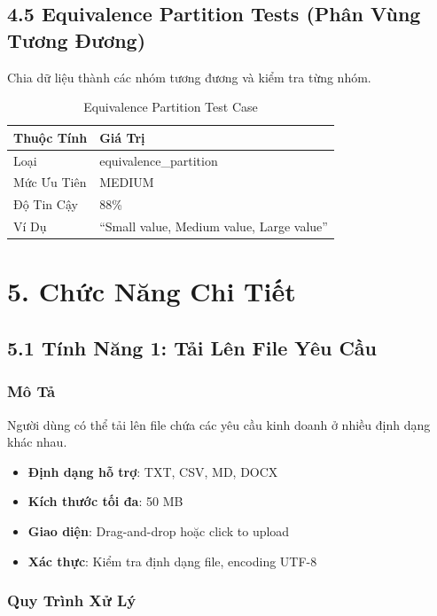 \documentclass[14pt,a4paper]{article}
\begin{document}
\subsection{4.5 Equivalence Partition Tests (Phân Vùng Tương Đương)}
Chia dữ liệu thành các nhóm tương đương và kiểm tra từng nhóm.

\begin{table}[h]
\centering
\begin{tabular}{|l|l|}
\hline
\textbf{Thuộc Tính} & \textbf{Giá Trị} \\
\hline
Loại & equivalence\_partition \\
\hline
Mức Ưu Tiên & MEDIUM \\
\hline
Độ Tin Cậy & 88\% \\
\hline
Ví Dụ & ``Small value, Medium value, Large value'' \\
\hline
\end{tabular}
\caption{Equivalence Partition Test Case}
\end{table}

\section{5. Chức Năng Chi Tiết}

\subsection{5.1 Tính Năng 1: Tải Lên File Yêu Cầu}

\subsubsection{Mô Tả}
Người dùng có thể tải lên file chứa các yêu cầu kinh doanh ở nhiều định dạng khác nhau.

\begin{itemize}
    \item \textbf{Định dạng hỗ trợ}: TXT, CSV, MD, DOCX
    \item \textbf{Kích thước tối đa}: 50 MB
    \item \textbf{Giao diện}: Drag-and-drop hoặc click to upload
    \item \textbf{Xác thực}: Kiểm tra định dạng file, encoding UTF-8
\end{itemize}

\subsubsection{Quy Trình Xử Lý}
\end{document}
